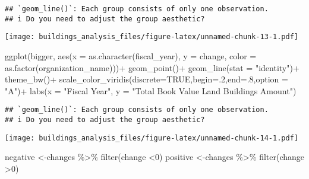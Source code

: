 \documentclass[
]{article}
\newenvironment{Shaded}{\begin{snugshade}}{\end{snugshade}}
\newcommand{\AttributeTok}[1]{\textcolor[rgb]{0.77,0.63,0.00}{#1}}
\newcommand{\ConstantTok}[1]{\textcolor[rgb]{0.00,0.00,0.00}{#1}}
\newcommand{\DecValTok}[1]{\textcolor[rgb]{0.00,0.00,0.81}{#1}}
\newcommand{\FunctionTok}[1]{\textcolor[rgb]{0.00,0.00,0.00}{#1}}
\newcommand{\NormalTok}[1]{#1}
\newcommand{\OtherTok}[1]{\textcolor[rgb]{0.56,0.35,0.01}{#1}}
\newcommand{\SpecialCharTok}[1]{\textcolor[rgb]{0.00,0.00,0.00}{#1}}
\newcommand{\StringTok}[1]{\textcolor[rgb]{0.31,0.60,0.02}{#1}}
\begin{document}
\begin{verbatim}
## `geom_line()`: Each group consists of only one observation.
## i Do you need to adjust the group aesthetic?
\end{verbatim}

\texttt{[image: buildings\_analysis\_files/figure-latex/unnamed-chunk-13-1.pdf]}

\begin{Shaded}
\begin{Highlighting}[]
  \FunctionTok{ggplot}\NormalTok{(bigger, }\FunctionTok{aes}\NormalTok{(}\AttributeTok{x =} \FunctionTok{as.character}\NormalTok{(fiscal\_year), }\AttributeTok{y =}\NormalTok{ change, }\AttributeTok{color =} \FunctionTok{as.factor}\NormalTok{(organization\_name)))}\SpecialCharTok{+}
    \FunctionTok{geom\_point}\NormalTok{()}\SpecialCharTok{+}
    \FunctionTok{geom\_line}\NormalTok{(}\AttributeTok{stat =} \StringTok{"identity"}\NormalTok{)}\SpecialCharTok{+}
    \FunctionTok{theme\_bw}\NormalTok{()}\SpecialCharTok{+}
    \FunctionTok{scale\_color\_viridis}\NormalTok{(}\AttributeTok{discrete=}\ConstantTok{TRUE}\NormalTok{,}\AttributeTok{begin=}\NormalTok{.}\DecValTok{2}\NormalTok{,}\AttributeTok{end=}\NormalTok{.}\DecValTok{8}\NormalTok{,}\AttributeTok{option =} \StringTok{"A"}\NormalTok{)}\SpecialCharTok{+}
    \FunctionTok{labs}\NormalTok{(}\AttributeTok{x =} \StringTok{"Fiscal Year"}\NormalTok{, }\AttributeTok{y =} \StringTok{"Total Book Value Land Buildings Amount"}\NormalTok{)}
\end{Highlighting}
\end{Shaded}

\begin{verbatim}
## `geom_line()`: Each group consists of only one observation.
## i Do you need to adjust the group aesthetic?
\end{verbatim}

\texttt{[image: buildings\_analysis\_files/figure-latex/unnamed-chunk-14-1.pdf]}

\begin{Shaded}
\begin{Highlighting}[]
\NormalTok{negative }\OtherTok{\textless{}{-}}\NormalTok{changes }\SpecialCharTok{\%\textgreater{}\%} 
  \FunctionTok{filter}\NormalTok{(change }\SpecialCharTok{\textless{}}\DecValTok{0}\NormalTok{)}
\NormalTok{positive }\OtherTok{\textless{}{-}}\NormalTok{changes }\SpecialCharTok{\%\textgreater{}\%} 
  \FunctionTok{filter}\NormalTok{(change }\SpecialCharTok{\textgreater{}}\DecValTok{0}\NormalTok{)}
\end{Highlighting}
\end{Shaded}
\end{document}
